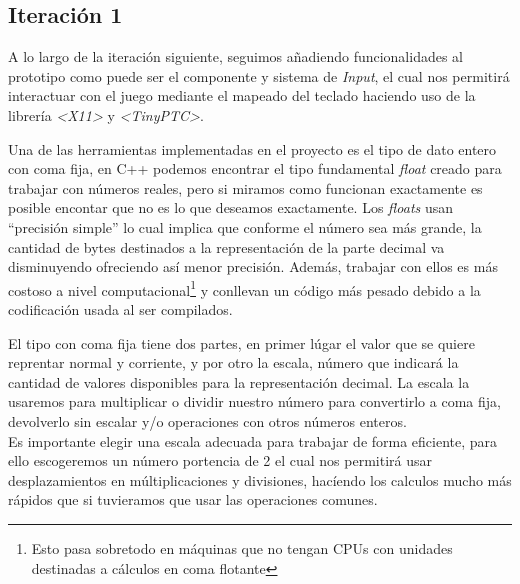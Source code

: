 \subsection*{Iteración 1}
A lo largo de la iteración siguiente, seguimos añadiendo funcionalidades al prototipo como puede 
ser el componente y sistema de \textit{Input}, el cual nos permitirá interactuar con el juego
mediante el mapeado del teclado haciendo uso de la librería \textit{\textless X11\textgreater}
y \textit{\textless TinyPTC\textgreater}.

Una de las herramientas implementadas en el proyecto es el tipo de dato entero con coma fija,
en C++ podemos encontrar el tipo fundamental \textit{float} creado para trabajar con números 
reales, pero si miramos como funcionan exactamente es posible encontar que no es lo que deseamos
exactamente. Los \textit{floats} usan ``precisión simple'' lo cual implica que conforme el número 
sea más grande, la cantidad de bytes destinados a la representación de la parte decimal va 
disminuyendo ofreciendo así menor precisión. Además, trabajar con ellos es más costoso a nivel
computacional\footnote{Esto pasa sobretodo en máquinas que no tengan CPUs con unidades destinadas 
a cálculos en coma flotante} y conllevan un código más pesado debido a la codificación usada 
al ser compilados.

El tipo con coma fija tiene dos partes, en primer lúgar el valor que se quiere reprentar normal
y corriente, y por otro la escala, número que indicará la cantidad de valores disponibles
para la representación decimal. La escala la usaremos para multiplicar o dividir nuestro número
para convertirlo a coma fija, devolverlo sin escalar y/o operaciones con otros números enteros.\\
Es importante elegir una escala adecuada para trabajar de forma eficiente, para ello escogeremos
un número portencia de 2 el cual nos permitirá usar desplazamientos en múltiplicaciones y divisiones,
hacíendo los calculos mucho más rápidos que si tuvieramos que usar las operaciones comunes.



